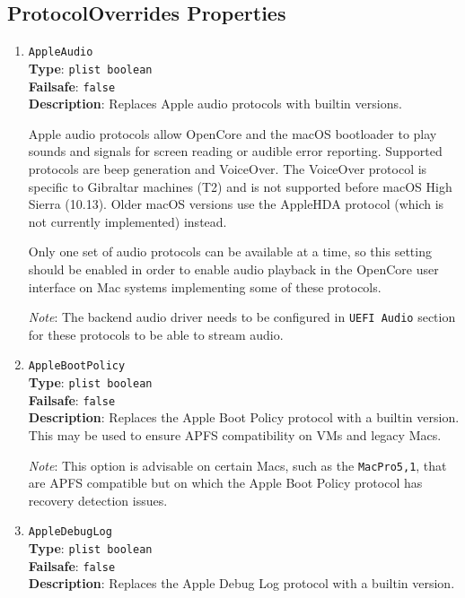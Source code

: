 \documentclass[]{article}
\begin{document}
\subsection{ProtocolOverrides Properties}\label{uefiprotoprops}

\begin{enumerate}

\item
  \texttt{AppleAudio}\\
  \textbf{Type}: \texttt{plist\ boolean}\\
  \textbf{Failsafe}: \texttt{false}\\
  \textbf{Description}: Replaces Apple audio protocols with builtin
  versions.

  Apple audio protocols allow OpenCore and the macOS bootloader to play
  sounds and signals for screen reading or audible error reporting.
  Supported protocols are beep generation and VoiceOver. The VoiceOver protocol
  is specific to Gibraltar machines (T2) and is not supported before
  macOS High Sierra (10.13). Older macOS versions use the AppleHDA protocol
  (which is not currently implemented) instead.

  Only one set of audio protocols can be available at a time, so this setting should
  be enabled in order to enable audio playback in the OpenCore user interface on Mac
  systems implementing some of these protocols.

  \emph{Note}: The backend audio driver needs to be configured in \texttt{UEFI Audio}
  section for these protocols to be able to stream audio.

\item
  \texttt{AppleBootPolicy}\\
  \textbf{Type}: \texttt{plist\ boolean}\\
  \textbf{Failsafe}: \texttt{false}\\
  \textbf{Description}: Replaces the Apple Boot Policy protocol with a builtin
  version. This may be used to ensure APFS compatibility on VMs and legacy Macs.

  \emph{Note}: This option is advisable on certain Macs, such as
  the \texttt{MacPro5,1}, that are APFS compatible but on which
  the Apple Boot Policy protocol has recovery detection issues.

\item
  \texttt{AppleDebugLog}\\
  \textbf{Type}: \texttt{plist\ boolean}\\
  \textbf{Failsafe}: \texttt{false}\\
  \textbf{Description}: Replaces the Apple Debug Log protocol with a builtin
  version.


\end{enumerate}
\end{document}
